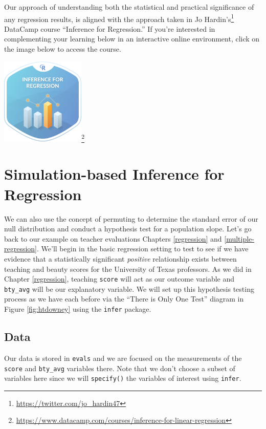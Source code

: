 \documentclass[12pt,]{krantz}
\renewcommand{\href}[2]{#2\footnote{\url{#1}}}
\begin{document}
Our approach of understanding both the statistical and practical
significance of any regression results, is aligned with the approach
taken in \href{https://twitter.com/jo_hardin47}{Jo Hardin's} DataCamp
course ``Inference for Regression.'' If you're interested in
complementing your learning below in an interactive online environment,
click on the image below to access the course.

\begin{center}
\href{https://www.datacamp.com/courses/inference-for-linear-regression}{\includegraphics[width=0.3\textwidth]{images/datacamp_inference_for_regression.png}}
\end{center}

\section{Simulation-based Inference for
Regression}\label{simulation-based-inference-for-regression}

We can also use the concept of permuting to determine the standard error
of our null distribution and conduct a hypothesis test for a population
slope. Let's go back to our example on teacher evaluations Chapters
\ref{regression} and \ref{multiple-regression}. We'll begin in the basic
regression setting to test to see if we have evidence that a
statistically significant \emph{positive} relationship exists between
teaching and beauty scores for the University of Texas professors. As we
did in Chapter \ref{regression}, teaching \texttt{score} will act as our
outcome variable and \texttt{bty\_avg} will be our explanatory variable.
We will set up this hypothesis testing process as we have each before
via the ``There is Only One Test'' diagram in Figure \ref{fig:htdowney}
using the \texttt{infer} package.

\subsection{Data}\label{data-1}

Our data is stored in \texttt{evals} and we are focused on the
measurements of the \texttt{score} and \texttt{bty\_avg} variables
there. Note that we don't choose a subset of variables here since we
will \texttt{specify()} the variables of interest using \texttt{infer}.
\end{document}
